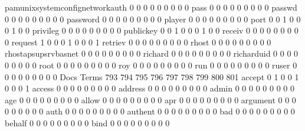 \documentclass[compress,8pt]{beamer}
\begin{document}
\begin{frame}
\begin{Schunk}
  pamunixsystemconfignetworkauth             0   0   0   0   0   0   0   0   0
  pass                                       0   0   0   0   0   0   0   0   0
  passwd                                     0   0   0   0   0   0   0   0   0
  password                                   0   0   0   0   0   0   0   0   0
  player                                     0   0   0   0   0   0   0   0   0
  port                                       0   0   1   0   0   0   1   0   0
  privileg                                   0   0   0   0   0   0   0   0   0
  publickey                                  0   0   1   0   0   0   1   0   0
  receiv                                     0   0   0   0   0   0   0   0   0
  request                                    1   0   0   0   1   0   0   0   1
  retriev                                    0   0   0   0   0   0   0   0   0
  rhost                                      0   0   0   0   0   0   0   0   0
  rhostapsupsrvbasnet                        0   0   0   0   0   0   0   0   0
  richard                                    0   0   0   0   0   0   0   0   0
  richarduid                                 0   0   0   0   0   0   0   0   0
  root                                       0   0   0   0   0   0   0   0   0
  roy                                        0   0   0   0   0   0   0   0   0
  run                                        0   0   0   0   0   0   0   0   0
  ruser                                      0   0   0   0   0   0   0   0   0
                                          Docs
Terms                                      793 794 795 796 797 798 799 800 801
  accept                                     0   1   0   0   1   0   0   0   1
  access                                     0   0   0   0   0   0   0   0   0
  address                                    0   0   0   0   0   0   0   0   0
  admin                                      0   0   0   0   0   0   0   0   0
  age                                        0   0   0   0   0   0   0   0   0
  allow                                      0   0   0   0   0   0   0   0   0
  apr                                        0   0   0   0   0   0   0   0   0
  argument                                   0   0   0   0   0   0   0   0   0
  auth                                       0   0   0   0   0   0   0   0   0
  authent                                    0   0   0   0   0   0   0   0   0
  bad                                        0   0   0   0   0   0   0   0   0
  behalf                                     0   0   0   0   0   0   0   0   0
  bind                                       0   0   0   0   0   0   0   0   0

\end{Schunk}
\end{frame}
\end{document}
